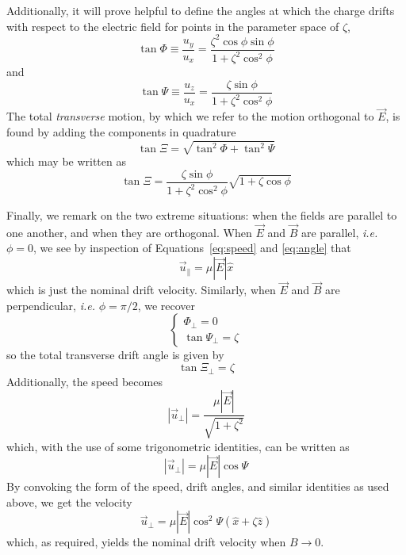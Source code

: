 \documentclass[twoside]{article}
\begin{document}
\begin{multicols}{2}
Additionally, it will prove helpful to define the angles at which the charge drifts with respect to the electric field for points in the parameter space of  $\zeta$,
\begin{equation}
\label{eq:phi}
              \tan \Phi \equiv  \frac{u_y}{u_x} = \frac{\zeta^2 \cos \phi \sin \phi}{1 + \zeta^2 \cos^2 \phi}            
\end{equation}
and
\begin{equation}
                \tan \Psi \equiv  \frac{u_z}{u_x} = \frac{\zeta \sin \phi}{1 + \zeta^2 \cos^2 \phi}        
\end{equation}
The total \emph{transverse} motion, by which we refer to the motion orthogonal to $\vec{E}$, is found by adding the components in quadrature  
\begin{equation}
                \tan \Xi = \sqrt{ \tan^2 \Phi +  \tan^2 \Psi }     
\end{equation}
which may be written as
\begin{equation}
\label{eq:angle}
\tan \Xi = \frac{\zeta \sin \phi}{1 + \zeta^2 \cos^2 \phi}\sqrt{1 + \zeta \cos \phi}   
\end{equation}


Finally, we remark on the two extreme situations: when the fields are parallel to one another, and when they are orthogonal. When $\vec{E}$ and $\vec{B}$ are parallel, \emph{i.e.} $\phi = 0$, we see by inspection of Equations~\ref{eq:speed} and \ref{eq:angle} that
\begin{equation}
    \vec{u}_\parallel = \mu |\vec{E}| \hat{x}
\end{equation}
which is just the nominal drift velocity. Similarly, when $\vec{E}$ and $\vec{B}$ are perpendicular, \emph{i.e.} $\phi = \pi/2$, we recover
\begin{equation} 
 \begin{cases}
 \Phi_\perp = 0 \\  
 \tan \Psi_\perp =  \zeta
 \end{cases}
\end{equation} 
so the total transverse drift angle is given by
\begin{equation} 
\tan \Xi_\perp = \zeta
\end{equation} 
Additionally, the speed becomes
\begin{equation} 
    |\vec{u}_\perp| = \frac{\mu |\vec{E}|}{\sqrt{1+ \zeta^2}} 
\end{equation}
which, with the use of some trigonometric identities, can be written as
\begin{equation} 
|\vec{u}_\perp| = \mu |\vec{E}| \cos \Psi
\end{equation} 
By convoking the form of the speed, drift angles, and similar identities as used above, we get the velocity
\begin{equation} 
\label{eq:perp}
    \vec{u}_\perp = \mu |\vec{E}| \cos^2 \Psi( \hat{x}  +  \zeta \hat{z}) 
\end{equation} 
which, as required, yields the nominal drift velocity when $B \to 0$.



\end{multicols}
\end{document}
